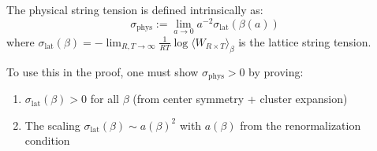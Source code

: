 \begin{definition}\label{def:intrinsic-string}
The physical string tension is defined intrinsically as:
\begin{equation}
    \sigma_{\text{phys}} := \lim_{a \to 0} a^{-2} \sigma_{\text{lat}}(\beta(a))
\end{equation}
where $\sigma_{\text{lat}}(\beta) = -\lim_{R,T \to \infty} \frac{1}{RT} \log \langle W_{R \times T} \rangle_\beta$ is the lattice string tension.

To use this in the proof, one must show $\sigma_{\text{phys}} > 0$ by proving:
\begin{enumerate}
    \item $\sigma_{\text{lat}}(\beta) > 0$ for all $\beta$ (from center symmetry + cluster expansion)
    \item The scaling $\sigma_{\text{lat}}(\beta) \sim a(\beta)^2$ with $a(\beta)$ from the renormalization condition
\end{enumerate}
\end{definition}




